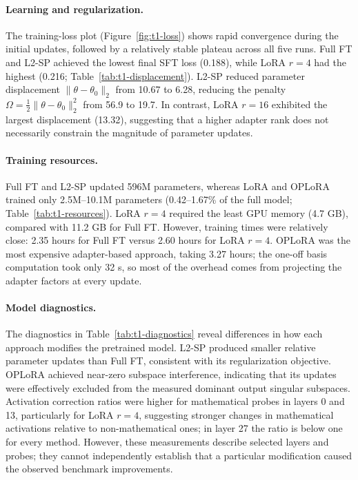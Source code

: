 \documentclass{article}
\begin{document}
\paragraph{Learning and regularization.}
The training-loss plot (Figure~\ref{fig:t1-loss}) shows rapid convergence during the initial updates, followed by a relatively stable plateau across all five runs. Full FT and L2-SP achieved the lowest final SFT loss (0.188), while LoRA $r{=}4$ had the highest (0.216; Table~\ref{tab:t1-displacement}). L2-SP reduced parameter displacement $\|\theta-\theta_0\|_2$ from 10.67 to 6.28, reducing the penalty $\Omega=\tfrac12\|\theta-\theta_0\|_2^2$ from 56.9 to 19.7. In contrast, LoRA $r{=}16$ exhibited the largest displacement (13.32), suggesting that a higher adapter rank does not necessarily constrain the magnitude of parameter updates.

\paragraph{Training resources.}
Full FT and L2-SP updated 596M parameters, whereas LoRA and OPLoRA trained only 2.5M--10.1M parameters (0.42--1.67\% of the full model; Table~\ref{tab:t1-resources}). LoRA $r{=}4$ required the least GPU memory (4.7 GB), compared with 11.2 GB for Full FT. However, training times were relatively close: 2.35 hours for Full FT versus 2.60 hours for LoRA $r{=}4$. OPLoRA was the most expensive adapter-based approach, taking 3.27 hours; the one-off basis computation took only 32 s, so most of the overhead comes from projecting the adapter factors at every update.

\paragraph{Model diagnostics.}
The diagnostics in Table~\ref{tab:t1-diagnostics} reveal differences in how each approach modifies the pretrained model. L2-SP produced smaller relative parameter updates than Full FT, consistent with its regularization objective. OPLoRA achieved near-zero subspace interference, indicating that its updates were effectively excluded from the measured dominant output singular subspaces. Activation correction ratios were higher for mathematical probes in layers 0 and 13, particularly for LoRA $r{=}4$, suggesting stronger changes in mathematical activations relative to non-mathematical ones; in layer 27 the ratio is below one for every method. However, these measurements describe selected layers and probes; they cannot independently establish that a particular modification caused the observed benchmark improvements.
\end{document}
